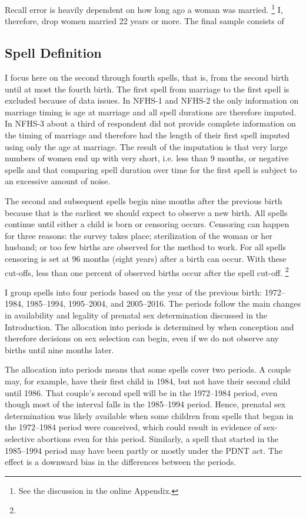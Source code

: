 \documentclass[12pt,letterpaper]{article}
\begin{document}
Recall error is heavily dependent on how long ago a woman was married.%
\footnote{
See the discussion in the online Appendix.
}
I, therefore, drop women married 22 years or more.
The final sample consists of 



\subsection{Spell Definition\label{sec:spell_def}}

I focus here on the second through fourth spells, that is, from the second birth until
at most the fourth birth.
The first spell from marriage to the first spell is excluded because of data issues.
In NFHS-1 and NFHS-2 the only information on marriage timing is age at marriage and all
spell durations are therefore imputed.
In NFHS-3 about a third of respondent did not provide complete information on the
timing of marriage and therefore had the length of their first spell imputed using only
the age at marriage.
The result of the imputation is that very large numbers of women end up with very short,
i.e. less than 9 months, or negative spells and that comparing spell duration over time
for the first spell is subject to an excessive amount of noise.

The second and subsequent spells begin nine months after the previous birth 
because that is the earliest we should expect to observe a new birth.
All spells continue until either a child is born or censoring occurs.
Censoring can happen for three reasons:
the survey takes place;
sterilization of the woman or her husband;
or too few births are observed for the method to work.
For all spells censoring is set at 96 months (eight years) after a birth can occur.
With these cut-offs, less than one percent of observed births occur after
the spell cut-off.%
\footnote{

}

I group spells into four periods based on the year of the previous birth:
1972--1984, 1985--1994, 1995--2004, and 2005--2016.
The periods follow the main changes in availability and legality of 
prenatal sex determination discussed in the Introduction.
The allocation into periods is determined by when conception and therefore 
decisions on sex selection can begin, even if we do not observe
any births until nine months later.

The allocation into periods means that some spells cover two periods.
A couple may, for example, have their first child in 1984, but not have their second 
child until 1986.
That couple's second spell will be in the 1972--1984 period, even though 
most of the interval falls in the 1985--1994 period.
Hence, prenatal sex determination was likely available when some
children from spells that began in the 1972--1984 period were conceived,
which could result in evidence of sex-selective abortions even for this
period.
Similarly, a spell that started in the 1985--1994 period may have been partly 
or mostly under the PDNT act.
The effect is a downward bias in the differences between the periods.
\end{document}
